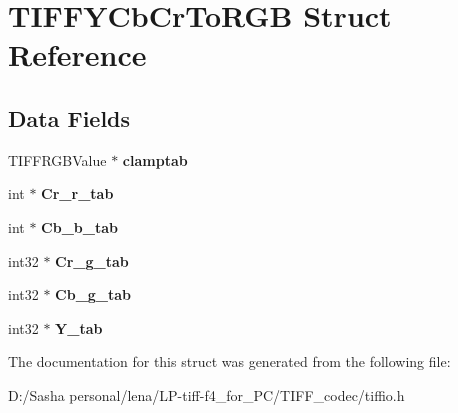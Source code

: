 \hypertarget{struct_t_i_f_f_y_cb_cr_to_r_g_b}{}\section{T\+I\+F\+F\+Y\+Cb\+Cr\+To\+R\+G\+B Struct Reference}
\label{struct_t_i_f_f_y_cb_cr_to_r_g_b}
\subsection*{Data Fields}
\begin{DoxyCompactItemize}
\item 
\hypertarget{struct_t_i_f_f_y_cb_cr_to_r_g_b_ae729495405cd5825c5244caa3788fda0}{}T\+I\+F\+F\+R\+G\+B\+Value $\ast$ {\bfseries clamptab}\label{struct_t_i_f_f_y_cb_cr_to_r_g_b_ae729495405cd5825c5244caa3788fda0}

\item 
\hypertarget{struct_t_i_f_f_y_cb_cr_to_r_g_b_ae6b1a209d6bbcec7d6014d03290137cd}{}int $\ast$ {\bfseries Cr\+\_\+r\+\_\+tab}\label{struct_t_i_f_f_y_cb_cr_to_r_g_b_ae6b1a209d6bbcec7d6014d03290137cd}

\item 
\hypertarget{struct_t_i_f_f_y_cb_cr_to_r_g_b_a9b8b7f4344f5a447b6c9a0921482f752}{}int $\ast$ {\bfseries Cb\+\_\+b\+\_\+tab}\label{struct_t_i_f_f_y_cb_cr_to_r_g_b_a9b8b7f4344f5a447b6c9a0921482f752}

\item 
\hypertarget{struct_t_i_f_f_y_cb_cr_to_r_g_b_af9dd93e1b89da35f2441a910ee629671}{}int32 $\ast$ {\bfseries Cr\+\_\+g\+\_\+tab}\label{struct_t_i_f_f_y_cb_cr_to_r_g_b_af9dd93e1b89da35f2441a910ee629671}

\item 
\hypertarget{struct_t_i_f_f_y_cb_cr_to_r_g_b_ac5fdfe244755fde0310841724b8f7135}{}int32 $\ast$ {\bfseries Cb\+\_\+g\+\_\+tab}\label{struct_t_i_f_f_y_cb_cr_to_r_g_b_ac5fdfe244755fde0310841724b8f7135}

\item 
\hypertarget{struct_t_i_f_f_y_cb_cr_to_r_g_b_af5d958de73816402f0e5b9cb8b94e0eb}{}int32 $\ast$ {\bfseries Y\+\_\+tab}\label{struct_t_i_f_f_y_cb_cr_to_r_g_b_af5d958de73816402f0e5b9cb8b94e0eb}

\end{DoxyCompactItemize}


The documentation for this struct was generated from the following file\+:\begin{DoxyCompactItemize}
\item 
D\+:/\+Sasha personal/lena/\+L\+P-\/tiff-\/f4\+\_\+for\+\_\+\+P\+C/\+T\+I\+F\+F\+\_\+codec/tiffio.\+h\end{DoxyCompactItemize}
